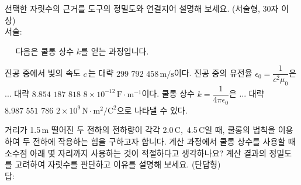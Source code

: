 \begin{graybox}\vspace*{0.2em}\bn
선택한 자릿수의 근거를 도구의 정밀도와 연결지어 설명해 보세요.
(서술형, 30자 이상) \\ 서술: 
\vspace*{2.4em}\end{graybox}\vspace{0.4em}


\clearpage


\bnset
\begin{graybox}\centering
{\fontsize{14pt}{17pt}\selectfont\bd{\an
\ItemTitlev
}}\vspace*{0.8em}\end{graybox}\vspace{0.4em}

\begin{graybox}
~~ 다음은 쿨롱 상수 $k$를 얻는 과정입니다. \vspace*{10pt}
\begin{graybox}\vspace*{0.6em}
\bul 진공 중에서 빛의 속도 $c$\,는 대략 $299\,\,792\,\,458\,\mathrm{m/s}$이다.
\bul 진공 중의 유전율 $\epsilon_0 = \dfrac{1}{c^2 \mu_0}$은 ... 대략
$8.854\,\,187\,\,818\,\,8 \times 10^{-12}\,\mathrm{F \cdot m^{-1}}$이다.
\bul 쿨롱 상수 $k = \dfrac{1}{4\pi \epsilon_0}$은 ... 대략
$8.987\,\,551\,\,786\,\,2 \times 10^9\,\mathrm{N \cdot m^2/C^2}$으로 나타낼 수 있다.
\vspace*{0.6em}\end{graybox}
\end{graybox}\vspace{0.4em}

\begin{graybox}\vspace*{0.2em}\bn
거리가 1.5\,m 떨어진 두 전하의 전하량이 각각 2.0\,C,\, 4.5\,C일 때,
쿨롱의 법칙을 이용하여 두 전하에 작용하는 힘을 구하고자 합니다.
계산 과정에서 쿨롱 상수를 사용할 때 소수점 아래 몇 자리까지 사용하는 것이 적절하다고 생각하나요?
계산 결과의 정밀도를 고려하여 자릿수를 판단하고 이유를 설명해 보세요.
(단답형) \\ 답: 
\vspace*{0.4em}\end{graybox}\vspace{0.4em}

